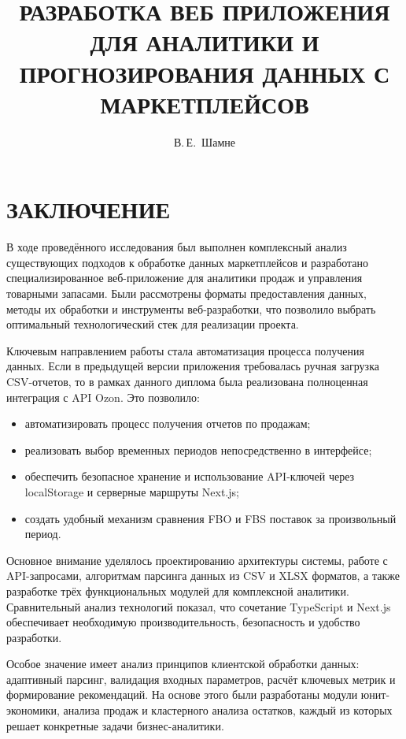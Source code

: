 \documentclass[14pt, oneside]{altsu-bachelor}
\title{РАЗРАБОТКА ВЕБ ПРИЛОЖЕНИЯ ДЛЯ АНАЛИТИКИ И ПРОГНОЗИРОВАНИЯ ДАННЫХ С МАРКЕТПЛЕЙСОВ}
\author{В.\,Е.~Шамне}
\institute{Институт цифровых технологий, электроники и физики}
\date{\the\year}
\begin{document}
\maketitle

\setcounter{page}{2}
\makeabstract
\tableofcontents





\chapter*{ЗАКЛЮЧЕНИЕ}
В ходе проведённого исследования был выполнен комплексный анализ существующих подходов к обработке данных маркетплейсов и разработано специализированное веб-приложение для аналитики продаж и управления товарными запасами. Были рассмотрены форматы предоставления данных, методы их обработки и инструменты веб-разработки, что позволило выбрать оптимальный технологический стек для реализации проекта.

Ключевым направлением работы стала автоматизация процесса получения данных. Если в предыдущей версии приложения требовалась ручная загрузка CSV-отчетов, то в рамках данного диплома была реализована полноценная интеграция с API Ozon. Это позволило:
\begin{itemize}
\item автоматизировать процесс получения отчетов по продажам;
\item реализовать выбор временных периодов непосредственно в интерфейсе;
\item обеспечить безопасное хранение и использование API-ключей через localStorage и серверные маршруты Next.js;
\item создать удобный механизм сравнения FBO и FBS поставок за произвольный период.
\end{itemize}

Основное внимание уделялось проектированию архитектуры системы, работе с API-запросами, алгоритмам парсинга данных из CSV и XLSX форматов, а также разработке трёх функциональных модулей для комплексной аналитики. Сравнительный анализ технологий показал, что сочетание TypeScript и Next.js обеспечивает необходимую производительность, безопасность и удобство разработки.

Особое значение имеет анализ принципов клиентской обработки данных: адаптивный парсинг, валидация входных параметров, расчёт ключевых метрик и формирование рекомендаций. На основе этого были разработаны модули юнит-экономики, анализа продаж и кластерного анализа остатков, каждый из которых решает конкретные задачи бизнес-аналитики.
\end{document}
